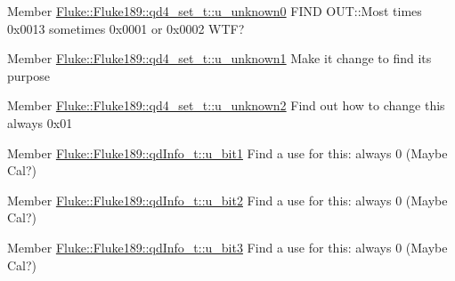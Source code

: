 \begin{DoxyDescription}
\item[Member \hyperlink{structFluke_1_1Fluke189_1_1qd4__set__t_a35c68a594812dba53791a2e32dbfacb6}{Fluke::Fluke189::qd4\_\-set\_\-t::u\_\-unknown0} ]FIND OUT::Most times 0x0013 sometimes 0x0001 or 0x0002 WTF? 
\end{DoxyDescription}

\label{todo__todo000019}
\hypertarget{todo__todo000019}{}
 
\begin{DoxyDescription}
\item[Member \hyperlink{structFluke_1_1Fluke189_1_1qd4__set__t_aa49bec7dfd9d22c392297cdff277afd9}{Fluke::Fluke189::qd4\_\-set\_\-t::u\_\-unknown1} ]Make it change to find its purpose 
\end{DoxyDescription}

\label{todo__todo000020}
\hypertarget{todo__todo000020}{}
 
\begin{DoxyDescription}
\item[Member \hyperlink{structFluke_1_1Fluke189_1_1qd4__set__t_a7ac5798f6713dc4b811b2388d9374c74}{Fluke::Fluke189::qd4\_\-set\_\-t::u\_\-unknown2} ]Find out how to change this always 0x01 
\end{DoxyDescription}

\label{todo__todo000009}
\hypertarget{todo__todo000009}{}
 
\begin{DoxyDescription}
\item[Member \hyperlink{structFluke_1_1Fluke189_1_1qdInfo__t_a49bb210666c03813d3e2dd5e7739c97f}{Fluke::Fluke189::qdInfo\_\-t::u\_\-bit1} ]Find a use for this: always 0 (Maybe Cal?) 
\end{DoxyDescription}

\label{todo__todo000010}
\hypertarget{todo__todo000010}{}
 
\begin{DoxyDescription}
\item[Member \hyperlink{structFluke_1_1Fluke189_1_1qdInfo__t_a3ee66a3c3b07169f2470fc7b8d832601}{Fluke::Fluke189::qdInfo\_\-t::u\_\-bit2} ]Find a use for this: always 0 (Maybe Cal?) 
\end{DoxyDescription}

\label{todo__todo000011}
\hypertarget{todo__todo000011}{}
 
\begin{DoxyDescription}
\item[Member \hyperlink{structFluke_1_1Fluke189_1_1qdInfo__t_a1989b018d05ed21b310846a8cba4099e}{Fluke::Fluke189::qdInfo\_\-t::u\_\-bit3} ]Find a use for this: always 0 (Maybe Cal?) 
\end{DoxyDescription}

